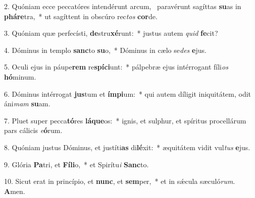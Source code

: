 2. Quóniam ecce peccatóres intendérunt arcum, \dag\  paravérunt sagíttas \textbf{su}as in \textbf{phá}\textbf{re}tra,~*  ut sagíttent in obscúro rec\textit{tos} \textbf{cor}de.\

3. Quóniam quæ perfecísti, \textbf{de}stru\textbf{xé}runt:~*  justus autem \textit{quid} \textbf{fe}cit?\

4. Dóminus in templo \textbf{sanc}to \textbf{su}o,~*  Dóminus in cælo se\textit{des} \textbf{e}jus.\

5. Oculi ejus in páupe\textbf{rem} re\textbf{spí}\textbf{ci}unt:~*  pálpebræ ejus intérrogant fíli\textit{os} \textbf{hó}minum.\

6. Dóminus intérrogat \textbf{jus}tum et \textbf{ím}\textbf{pi}um:~*  qui autem díligit iniquitátem, odit áni\textit{mam} \textbf{su}am.\

7. Pluet super pecca\textbf{tó}res \textbf{lá}\textbf{que}os:~*  ignis, et sulphur, et spíritus procellárum pars cálicis \textit{e}\textbf{ó}rum.\

8. Quóniam justus Dóminus, et justíti\textbf{as} di\textbf{lé}xit:~*  æquitátem vidit vul\textit{tus} \textbf{e}jus.\

9. Glória \textbf{Pa}tri, et \textbf{Fí}\textbf{li}o,~*  et Spirítu\textit{i} \textbf{Sanc}to.\

10. Sicut erat in princípio, et \textbf{nunc}, et \textbf{sem}per,~*  et in sǽcula sæculó\textit{rum}. \textbf{A}men.\

